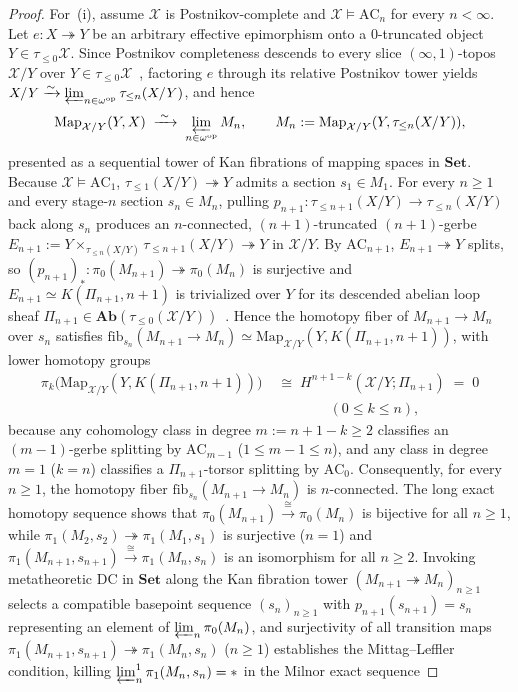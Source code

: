 \begin{proof}
For~(i), assume $\mathcal{X}$ is Postnikov-complete and $\mathcal{X} \models \mathrm{AC}_n$ for every $n < \infty$. Let $e : X \twoheadrightarrow Y$ be an arbitrary effective epimorphism onto a $0$-truncated object $Y \in \tau_{\le 0}\mathcal{X}$. Since Postnikov completeness descends to every slice $(\infty, 1)$-topos $\mathcal{X}/Y$ over $Y \in \tau_{\le 0}\mathcal{X}$~\cite[\S 5.5.6]{Lurie09}, factoring $e$ through its relative Postnikov tower yields $X/Y \xrightarrow{\sim} \varprojlim_{n \in \omega^{\mathrm{op}}} \tau_{\le n}(X/Y)$, and hence
\[
  \mathrm{Map}_{\mathcal{X}/Y}(Y, X) \;\xrightarrow{\;\sim\;}\; \varprojlim_{n \in \omega^{\mathrm{op}}} M_n, \qquad M_n := \mathrm{Map}_{\mathcal{X}/Y}(Y, \tau_{\le n}(X/Y)),
\]
presented as a sequential tower of Kan fibrations of mapping spaces in $\mathbf{Set}$. Because $\mathcal{X} \models \mathrm{AC}_1$, $\tau_{\le 1}(X/Y) \twoheadrightarrow Y$ admits a section $s_1 \in M_1$. For every $n \ge 1$ and every stage-$n$ section $s_n \in M_n$, pulling $p_{n+1} : \tau_{\le n+1}(X/Y) \to \tau_{\le n}(X/Y)$ back along $s_n$ produces an $n$-connected, $(n+1)$-truncated $(n+1)$-gerbe $E_{n+1} := Y \times_{\tau_{\le n}(X/Y)} \tau_{\le n+1}(X/Y) \twoheadrightarrow Y$ in $\mathcal{X}/Y$. By $\mathrm{AC}_{n+1}$, $E_{n+1} \twoheadrightarrow Y$ splits, so $(p_{n+1})_* : \pi_0(M_{n+1}) \twoheadrightarrow \pi_0(M_n)$ is surjective and $E_{n+1} \simeq K(\Pi_{n+1}, n+1)$ is trivialized over $Y$ for its descended abelian loop sheaf $\Pi_{n+1} \in \mathbf{Ab}(\tau_{\le 0}(\mathcal{X}/Y))$~\cite[\S 7.2.2]{Lurie09}. Hence the homotopy fiber of $M_{n+1} \to M_n$ over $s_n$ satisfies $\mathrm{fib}_{s_n}(M_{n+1} \to M_n) \simeq \mathrm{Map}_{\mathcal{X}/Y}(Y, K(\Pi_{n+1}, n+1))$, with lower homotopy groups
\[
  \begin{aligned}
    \pi_k\bigl(\mathrm{Map}_{\mathcal{X}/Y}(Y, K(\Pi_{n+1}, n+1))\bigr)
    &\;\cong\; H^{n+1-k}(\mathcal{X}/Y; \Pi_{n+1}) \;=\; 0 \\
    &\qquad\qquad (0 \le k \le n),
  \end{aligned}
\]
because any cohomology class in degree $m := n+1-k \ge 2$ classifies an $(m-1)$-gerbe splitting by $\mathrm{AC}_{m-1}$ ($1 \le m-1 \le n$), and any class in degree $m = 1$ ($k = n$) classifies a $\Pi_{n+1}$-torsor splitting by $\mathrm{AC}_0$. Consequently, for every $n \ge 1$, the homotopy fiber $\mathrm{fib}_{s_n}(M_{n+1} \to M_n)$ is $n$-connected. The long exact homotopy sequence shows that $\pi_0(M_{n+1}) \xrightarrow{\cong} \pi_0(M_n)$ is bijective for all $n \ge 1$, while $\pi_1(M_2, s_2) \twoheadrightarrow \pi_1(M_1, s_1)$ is surjective ($n = 1$) and $\pi_1(M_{n+1}, s_{n+1}) \xrightarrow{\cong} \pi_1(M_n, s_n)$ is an isomorphism for all $n \ge 2$. Invoking metatheoretic $\mathrm{DC}$ in $\mathbf{Set}$ along the Kan fibration tower $(M_{n+1} \twoheadrightarrow M_n)_{n \ge 1}$ selects a compatible basepoint sequence $(s_n)_{n \ge 1}$ with $p_{n+1}(s_{n+1}) = s_n$ representing an element of $\varprojlim_n \pi_0(M_n)$, and surjectivity of all transition maps $\pi_1(M_{n+1}, s_{n+1}) \twoheadrightarrow \pi_1(M_n, s_n)$ ($n \ge 1$) establishes the Mittag--Leffler condition, killing $\varprojlim^1_n \pi_1(M_n, s_n) = *$ in the Milnor exact sequence

\end{proof}
